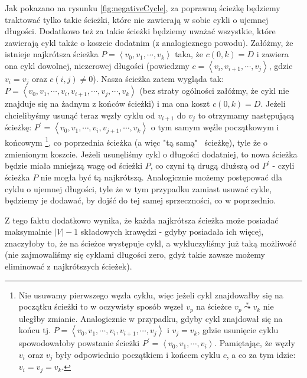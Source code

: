 Jak pokazano na rysunku \ref{fig:negativeCycle}, za poprawną ścieżkę będziemy traktować tylko takie ścieżki, które nie zawierają w sobie cykli o ujemnej długości. Dodatkowo też za takie ścieżki będziemy uważać wszystkie, które zawierają cykl także o koszcie dodatnim (z analogicznego powodu). Załóżmy, że istnieje najkrótsza ścieżka $P = \left \langle v_{0}, v_{1}, \cdots, v_{k} \right \rangle $ taka, że $c \left( 0, k \right) = D$ i zawiera ona cykl dowolnej, niezerowej długości (powiedzmy $c = \left \langle v_{i}, v_{i+1}, \cdots, v_{j} \right \rangle $, gdzie $v_{i} = v_{j} $ oraz $c \left( i, j \right) \neq 0$). Nasza ścieżka zatem wygląda tak: $P = \left \langle v_{0}, v_{1}, \cdots, v_{i}, v_{i+1}, \cdots, v_{j}, \cdots, v_{k} \right \rangle $ (bez straty ogólności załóżmy, że cykl nie znajduje się na żadnym z końców ścieżki) i ma ona koszt $c \left( 0, k \right) = D$. Jeżeli chcielibyśmy usunąć teraz węzły cyklu od $v_{i+1}$ do $v_{j}$ to otrzymamy następującą ścieżkę: $P^{'} = \left \langle v_{0}, v_{1}, \cdots, v_{i}, v_{j+1}, \cdots, v_{k} \right \rangle $ o tym samym węźle początkowym i końcowym \footnote{Nie usuwamy pierwszego węzła cyklu, więc jeżeli cykl znajdowałby się na początku ścieżki to w oczywisty sposób węzeł $v_{p}$ na ścieżce $v_{p} \overset{*}\leadsto v_{k}$ nie uległby zmianie. Analogicznie w przypadku, gdyby cykl znajdował się na końcu tj. $P = \left \langle v_{0}, v_{1}, \cdots, v_{i}, v_{i+1}, \cdots, v_{j} \right \rangle $ i $v_{j}=v_{k}$, gdzie usunięcie cyklu spowodowałoby powstanie ścieżki  $P^{'} = \left \langle v_{0}, v_{1}, \cdots, v_{i} \right \rangle $. Pamiętając, że węzły $v_{i}$ oraz $v_{j}$ były odpowiednio początkiem i końcem cyklu $c$, a co za tym idzie: $v_{i} = v_{j} = v_{k} $.}, co poprzednia ścieżka (a więc "tą samą"~ ścieżkę), tyle że o zmienionym koszcie. Jeżeli usunęliśmy cykl o długości dodatniej, to nowa ścieżka będzie miała mniejszą wagę od ścieżki $P$, co czyni tą drugą dłuższą od $P^{'}$ - czyli ścieżka $P$ nie mogła być tą najkrótszą. Analogicznie możemy postępować dla cyklu o ujemnej długości, tyle że w tym przypadku zamiast usuwać cykle, będziemy je dodawać, by dojść do tej samej sprzeczności, co w poprzednio.

Z tego faktu dodatkowo wynika, że każda najkrótsza ścieżka może posiadać maksymalnie $\left| V \right| - 1$ składowych krawędzi - gdyby posiadała ich więcej, znaczyłoby to, że na ścieżce występuje cykl, a wykluczyliśmy już taką możliwość (nie zajmowaliśmy się cyklami długości zero, gdyż takie zawsze możemy eliminować z najkrótszych ścieżek).

